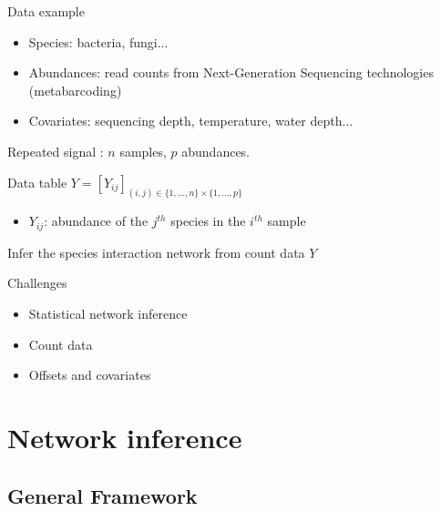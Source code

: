 \documentclass[9pt]{beamer}
\newcommand{\emphase}[1]{\textcolor{Complement}{#1}}
\begin{document}
\begin{frame}{Data example}
	\begin{itemize}
	\item \emphase{Species}: bacteria, fungi...
	\item \emphase{Abundances}: read counts from Next-Generation Sequencing technologies (metabarcoding)
	\item \emphase{Covariates}: sequencing depth, temperature, water depth...  \bigskip
	
\end{itemize}
	Repeated signal : $n$ samples, $p$ abundances.
\begin{block}{Data table}
	$Y = [Y_{ij}]_{(i,j) \in \{1,...,n\} \times \{1,..., p\}} $
	\begin{itemize}
	\item $Y_{ij}$: abundance of the $j^{th}$ species in the $i^{th}$ sample
\end{itemize}
\end{block}
\begin{center}
	Infer the \emphase{species interaction network} from count data $Y$
\end{center}
\end{frame}
\begin{frame}{Challenges}\large{
	\begin{itemize}
	\item  Statistical network inference \bigskip\bigskip
	\item Count data \bigskip\bigskip
	\item Offsets and covariates
\end{itemize}}
\end{frame}

\section{Network inference}
\subsection{General Framework}
\end{document}
